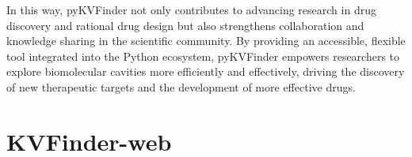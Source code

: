 \documentclass[Ingles]{phdthesis}
\begin{document}
In this way, pyKVFinder not only contributes to advancing research in drug discovery and rational drug design but also strengthens collaboration and knowledge sharing in the scientific community. By providing an accessible, flexible tool integrated into the Python ecosystem, pyKVFinder empowers researchers to explore biomolecular cavities more efficiently and effectively, driving the discovery of new therapeutic targets and the development of more effective drugs.

\section{KVFinder-web}


\end{document}
